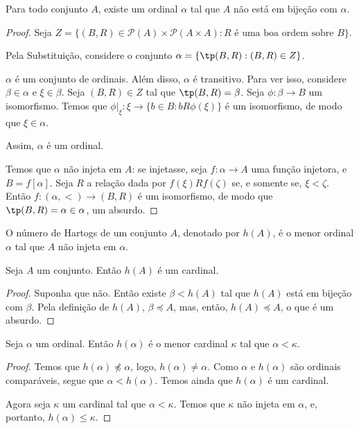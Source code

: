 \begin{proposition}\label{prop:teoremaDeHartogs}
    Para todo conjunto $A$, existe um ordinal $\alpha$ tal que $A$ não está em bijeção com $\alpha$.
\end{proposition}
\begin{proof}
    Seja $Z=\{(B, R) \in \mathcal P(A) \times \mathcal{P}(A\times A) : R \text{ é uma boa ordem sobre } B\}$.
    
    Pela Substituição, considere o conjunto $\alpha=\{\tp(B, R) : (B, R)\in Z\}$.

    $\alpha$ é um conjunto de ordinais.
    Além disso, $\alpha$ é transitivo.
    Para ver isso, considere $\beta\in \alpha$ e $\xi\in \beta$.
    Seja $(B, R)\in Z$ tal que $\tp(B, R)=\beta$.
    Seja $\phi: \beta \to B$ um isomorfismo.
    Temos que $\phi|_\xi: \xi \to \{b \in B: b R \phi(\xi)\}$ é um isomorfismo, de modo que $\xi\in \alpha$.
    
    Assim, $\alpha$ é um ordinal.

    Temos que $\alpha$ não injeta em $A$: se injetasse, seja $f:\alpha \to A$ uma função injetora, e $B=f[\alpha]$.
    Seja $R$ a relação dada por $f(\xi) R f(\zeta)$ se, e somente se, $\xi<\zeta$.
    Então $f:(\alpha, <)\to (B, R)$ é um isomorfismo, de modo que $\tp(B, R)=\alpha\in \alpha$, um absurdo.
\end{proof}

\begin{definition}\label{def:numeroDeHartogs}
    O número de Hartogs de um conjunto $A$, denotado por $h(A)$, é o menor ordinal $\alpha$ tal que $A$ não injeta em $\alpha$.
\end{definition}

\begin{lemma}\label{lem:hartogsEhCardinal}
    Seja $A$ um conjunto.
    Então $h(A)$ é um cardinal.
\end{lemma}
\begin{proof}
    Suponha que não.
    Então existe $\beta<h(A)$ tal que $h(A)$ está em bijeção com $\beta$.
    Pela definição de $h(A)$, $\beta \preceq A$, mas, então, $h(A)\preceq A$, o que é um absurdo.
\end{proof}

\begin{lemma}\label{lem:hartogsEhMenorCardinalMaior}
    Seja $\alpha$ um ordinal.
    Então $h(\alpha)$ é o menor cardinal $\kappa$ tal que $\alpha<\kappa$.
\end{lemma}
\begin{proof}
    Temos que $h(\alpha)\not\preceq \alpha$, logo, $h(\alpha)\neq \alpha$.
    Como $\alpha$ e $h(\alpha)$ são ordinais comparáveis, segue que $\alpha<h(\alpha)$.
    Temos ainda que $h(\alpha)$ é um cardinal.

    Agora seja $\kappa$ um cardinal tal que $\alpha<\kappa$.
    Temos que $\kappa$ não injeta em $\alpha$, e, portanto, $h(\alpha)\leq \kappa$.
\end{proof}

